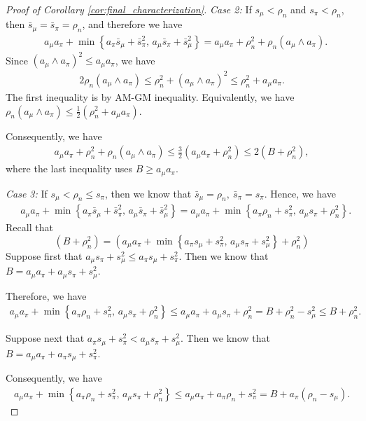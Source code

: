 \documentclass[11pt]{article}
\begin{document}
\begin{proof}[Proof of Corollary \ref{cor:final_characterization}]
\noindent
\emph{Case 2:} If \(s_\mu<\rho_n\) and \(s_\pi<\rho_n\), then $\bar s_\mu=\bar s_\pi=\rho_n$, and therefore we have
\begin{align*}
&a_\mu a_\pi+
\min\left\{
a_\pi\bar s_\mu+\bar s_\pi^2,\,
a_\mu\bar s_\pi+\bar s_\mu^2
\right\}
=
a_\mu a_\pi+\rho_n^2
+\rho_n(a_\mu\wedge a_\pi).
\end{align*}
Since $(a_\mu\wedge a_\pi)^2\le a_\mu a_\pi$, we have
\begin{align*}
2\rho_n(a_\mu\wedge a_\pi)\le
\rho_n^2+(a_\mu\wedge a_\pi)^2
\le
\rho_n^2+a_\mu a_\pi.
\end{align*}
The first inequality is by AM-GM inequality. Equivalently, we have $\rho_n(a_\mu\wedge a_\pi)
\le
\frac12\left(\rho_n^2+a_\mu a_\pi\right)$.

Consequently, we have
\begin{align*}
a_\mu a_\pi+\rho_n^2+\rho_n(a_\mu\wedge a_\pi)
\le
\frac32\left(a_\mu a_\pi+\rho_n^2\right)
\le
2\left(B+\rho_n^2\right),
\end{align*}
where the last inequality uses \(B\ge a_\mu a_\pi\).

\medskip

\noindent
\emph{Case 3:} If \(s_\mu<\rho_n\le s_\pi\), then we know that $\bar s_\mu=\rho_n,
\ 
\bar s_\pi=s_\pi$.
Hence, we have
\begin{align*}
&a_\mu a_\pi+
\min\left\{
a_\pi\bar s_\mu+\bar s_\pi^2,\,
a_\mu\bar s_\pi+\bar s_\mu^2
\right\}
=
a_\mu a_\pi+
\min\left\{
a_\pi\rho_n+s_\pi^2,\,
a_\mu s_\pi+\rho_n^2
\right\}.
\end{align*}
Recall that
\[
(B+\rho_n^2)=(
a_\mu a_\pi+
\min\left\{
a_\pi s_\mu+s_\pi^2,\,
a_\mu s_\pi+s_\mu^2
\right\}+\rho_n^2)
\]
Suppose first that $a_\mu s_\pi+s_\mu^2
\le
a_\pi s_\mu+s_\pi^2$. Then we know that $B=a_\mu a_\pi+a_\mu s_\pi+s_\mu^2$.

Therefore, we have
\begin{align*}
a_\mu a_\pi+
\min\left\{
a_\pi\rho_n+s_\pi^2,\,
a_\mu s_\pi+\rho_n^2
\right\}
\le
a_\mu a_\pi+a_\mu s_\pi+\rho_n^2=
B+\rho_n^2-s_\mu^2
\le
B+\rho_n^2.
\end{align*}

Suppose next that $a_\pi s_\mu+s_\pi^2
<
a_\mu s_\pi+s_\mu^2$. Then we know that $B=a_\mu a_\pi+a_\pi s_\mu+s_\pi^2$.

Consequently, we have
\begin{align*}
a_\mu a_\pi+
\min\left\{
a_\pi\rho_n+s_\pi^2,\,
a_\mu s_\pi+\rho_n^2
\right\}
\le
a_\mu a_\pi+a_\pi\rho_n+s_\pi^2
=
B+a_\pi(\rho_n-s_\mu).
\end{align*}


\end{proof}
\end{document}
